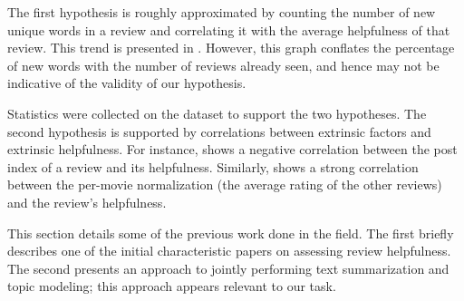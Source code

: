 \documentclass[letter,12pt]{article}
\begin{document}
The first hypothesis is roughly approximated by counting the number of
	new unique words in a review and correlating it with the average helpfulness
	of that review.
This trend is presented in .
However, this graph conflates the percentage of new words with the number of
	reviews already seen, and hence may not be indicative of the validity
	of our hypothesis.

Statistics were collected on the dataset to support the two hypotheses.
The second hypothesis is supported by correlations between extrinsic
	factors and extrinsic helpfulness.
For instance,  shows a negative correlation between the
	post index of a review and its helpfulness.
Similarly,  shows a strong correlation between the
	per-movie normalization (the average rating of the other reviews)
	and the review's helpfulness.







This section details some of the previous work done in the field.
The first briefly describes one of the initial characteristic papers
	on assessing review helpfulness.
The second presents an approach to jointly performing text summarization
	and topic modeling; this approach appears relevant to our task.
\end{document}
